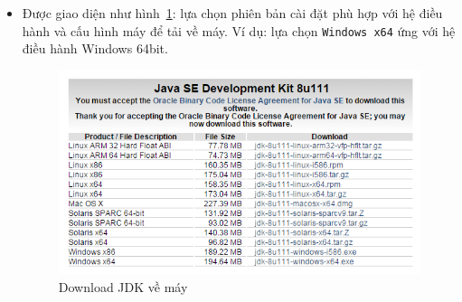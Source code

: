 \documentclass[13pt,a4paper]{extreport}
\begin{document}
\begin{itemize}
\begin{itemize}
				\item Được giao diện như hình~\ref{Fig:setup-JDK-2}: lựa chọn phiên bản cài đặt phù hợp với hệ điều hành và cấu hình máy để tải về máy. Ví dụ: lựa chọn \verb|Windows x64| ứng với hệ điều hành Windows 64bit.
					\begin{figure}[!h]
						\vspace{-.5cm}
						\begin{center}
							\includegraphics[scale=1]{setup-JDK-2.png}								
						\end{center}
						\caption{Download JDK về máy}
						\label{Fig:setup-JDK-2}
						\vspace{-.5cm}
					\end{figure}
			\end{itemize}


\end{itemize}
\end{document}
